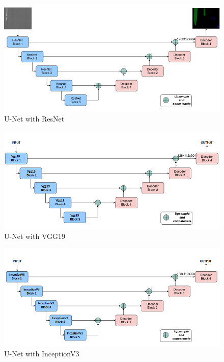 \documentclass[rnd]{mas_proposal}
\begin{document}
\begin{figure}[htp] 
        \centering
        \includegraphics[width=1.2\textwidth]{images/fig4.png}
        \caption{U-Net with ResNet}%
        \label{fig:U-Net with ResNet}%
\end{figure}

\begin{figure}[htp] 
        \centering
        \includegraphics[width=1.2\textwidth]{images/fig7.png}
        \caption{U-Net with VGG19}%
        \label{fig:U-Net with VGG19}%
\end{figure}

\begin{figure}[htp] 
        \centering
        \includegraphics[width=1.2\textwidth]{images/fig8.png}
        \caption{U-Net with InceptionV3}%
        \label{fig:U-Net with InceptionV3}%
\end{figure}
\end{document}
